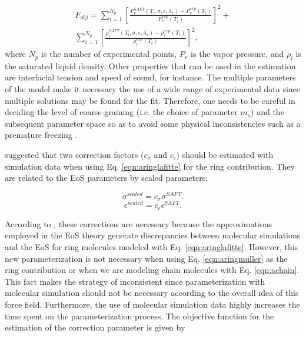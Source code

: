 \begin{equation}
\begin{aligned}
F_{obj}= \sum_{i=1}^{N_{p}} \left[\frac{P_{v}^{SAFT}(T_{i},\sigma,\epsilon,\lambda_{r})-P_{v}^{exp}(T_{i})}{P_{v}^{exp}(T_{i})} \right]^2 +\\
\sum_{i=1}^{N_{p}} \left[\frac{\rho_{l}^{SAFT}(T_{i},\sigma,\epsilon,\lambda_{r})-\rho_{l}^{exp}(T_{i})}{\rho_{l}^{exp}(T_{i})} \right]^2 ,
\end{aligned}
\label{eqn:fobj}
\end{equation}
where $N_{p}$ is the number of experimental points, $P_{v}$ is the vapor pressure, and $\rho_{l}$ is the saturated liquid density. Other properties that can be used in the estimation are interfacial tension and speed of sound, for instance. The multiple parameters of the model make it necessary the use of a wide range of experimental data since multiple solutions may be found for the fit. Therefore, one needs to be careful in deciding the level of coarse-graining (i.e. the choice of parameter $m_{s}$) and the subsequent parameter space so as to avoid some physical inconsistencies such as a premature freezing \cite{lobanova2015}.

 suggested that two correction factors ($c_{\sigma}$ and $c_{\epsilon}$) should be estimated with simulation data when using Eq. \eqref{eqn:aringlafitte} for the ring contribution. They are related to the EoS parameters by scaled parameters:

\begin{equation}
\sigma^{scaled} = c_{\sigma}\sigma^{SAFT}.
\label{eqn:csigma}
\end{equation}
\begin{equation}
\epsilon^{scaled} = c_{\epsilon}\epsilon^{SAFT}.
\label{eqn:ceps}
\end{equation}

According to , these corrections are necessary because the approximations employed in the EoS theory generate discrepancies between molecular simulations and the EoS for ring molecules modeled with Eq. \eqref{eqn:aringlafitte}. However, this new parameterization is not necessary when using Eq. \eqref{eqn:aringmuller} as the ring contribution or when we are modeling chain molecules with Eq. \ref{eqn:achain}. This fact makes the strategy of  inconsistent since parameterization with molecular simulation should not be necessary according to the overall idea of this force field. Furthermore, the use of molecular simulation data highly increases the time spent on the parameterization process. The objective function for the estimation of the correction parameter is given by

